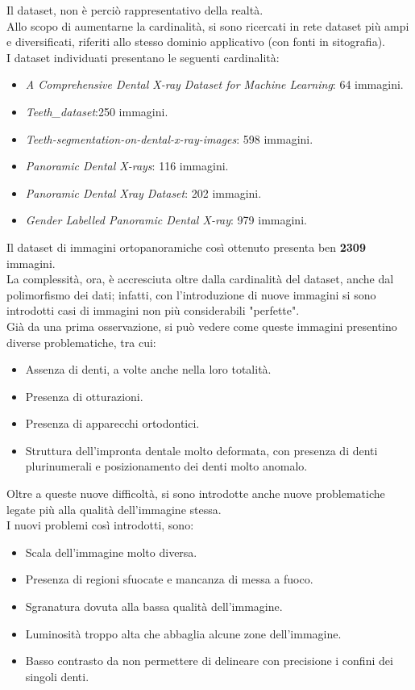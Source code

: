 \documentclass[12pt,a4paper,openright,twoside]{book}
\begin{document}
Il dataset, non è perciò rappresentativo della realtà.\\

Allo scopo di aumentarne la cardinalità, si sono ricercati in rete dataset più ampi e diversificati, riferiti allo stesso dominio applicativo (con fonti in sitografia).\\
I dataset individuati presentano le seguenti cardinalità:
\begin{itemize}
\item {\itshape A Comprehensive Dental X-ray Dataset for Machine Learning}: 64 immagini.
\item {\itshape Teeth\_dataset}:250 immagini.
\item {\itshape Teeth-segmentation-on-dental-x-ray-images}: 598 immagini.
\item {\itshape Panoramic Dental X-rays}: 116  immagini.
\item {\itshape Panoramic Dental Xray Dataset}: 202 immagini.
\item {\itshape Gender Labelled Panoramic Dental X‑ray}: 979 immagini.
\end{itemize}

Il dataset di immagini ortopanoramiche così ottenuto presenta ben \textbf{2309} immagini.\\
La complessità, ora, è accresciuta oltre dalla cardinalità del dataset, anche dal polimorfismo dei dati; infatti, con l'introduzione di nuove immagini si sono introdotti casi di immagini non più considerabili "perfette".\\
Già da una prima osservazione, si può vedere come queste immagini presentino diverse problematiche, tra cui:
\begin{itemize}
\item Assenza di denti, a volte anche nella loro totalità.
\item Presenza di otturazioni.
\item Presenza di apparecchi ortodontici.
\item Struttura dell'impronta dentale molto deformata, con presenza di denti plurinumerali e posizionamento dei denti molto anomalo.
\end{itemize}

Oltre a queste nuove difficoltà, si sono introdotte anche nuove problematiche legate più alla qualità dell'immagine stessa.\\

I nuovi problemi così introdotti, sono:
\begin{itemize}
\item Scala dell'immagine molto diversa.
\item Presenza di regioni sfuocate e mancanza di messa a fuoco.
\item Sgranatura dovuta alla bassa qualità dell'immagine.
\item Luminosità troppo alta che abbaglia alcune zone dell'immagine.
\item Basso contrasto da non permettere di delineare con precisione i confini dei singoli denti.
\end{itemize}
\end{document}
